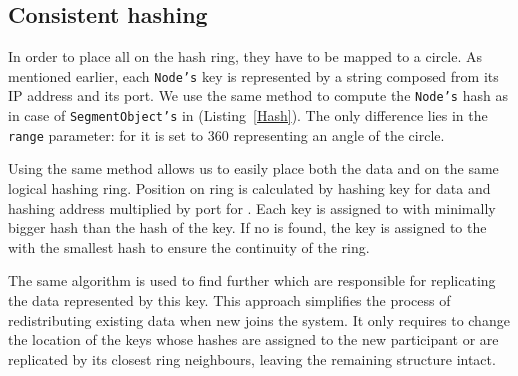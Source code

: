                 
    \subsection{Consistent hashing} \label{ConsistentHashing}
        In order to place all \Nodes on the hash ring, they have to be mapped to a circle.
        As mentioned earlier, each \texttt{Node's} key is represented by a string composed from its IP address and its port. 
        We use the same method to compute the \texttt{Node's} hash as in case of \texttt{SegmentObject's} in \PHT (Listing~\ref{Hash}).
        The only difference lies in the \texttt{range} parameter: for \Nodes it is set to 360 representing an angle of the circle.
            
        Using the same method allows us to easily place both the \PHT data and \Nodes on the same logical hashing ring.
        Position on ring is calculated by hashing key for data and hashing address multiplied by port for \Nodes.
        Each key is assigned to \Node with minimally bigger hash than the hash of the key.
        If no \Node is found, the key is assigned to the \Node with the smallest hash to ensure the continuity of the ring.
            
        The same algorithm is used to find further \Nodes which are responsible for replicating the data represented by this key.
        This approach simplifies the process of redistributing existing data when new \Node joins the system.
        It only requires to change the location of the keys whose hashes are assigned to the new participant or are replicated by its closest ring neighbours, leaving the remaining structure intact.
        
